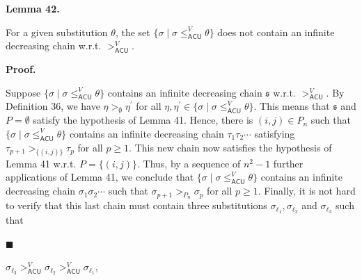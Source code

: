  
\par\medskip\noindent\textbf{Lemma 42.}\par
 
 
For a given substitution $\theta$, the set $\{\sigma\mid\sigma\leq_{\mathsf{ACU}}^{V}\theta\}$ does not contain an infinite decreasing chain w.r.t. $>_{\mathsf{ACU}}^{V}$.\par
 
 
 
 
 
\par\medskip\noindent\textbf{Proof.}\par
 
 
Suppose $\{\sigma\mid\sigma\leq_{\mathsf{ACU}}^{V}\theta\}$ contains an infinite decreasing chain $\mathfrak{s}$ w.r.t. $>_{\mathsf{ACU}}^{V}$. By Definition 36, we have $\eta>_{\emptyset}\eta^{\prime}$ for all $\eta,\eta^{\prime}\in\{\sigma\mid\sigma\leq_{\mathsf{ACU}}^{V}\theta\}$. This means that $\mathfrak{s}$ and $P=\emptyset$ satisfy the hypothesis of Lemma 41. Hence, there is $(i,j)\in P_{n}$ such that $\{\sigma\mid\sigma\leq_{\mathsf{ACU}}^{V}\theta\}$ contains an infinite decreasing chain $\tau_{1}\tau_{2}\cdots$ satisfying $\tau_{p+1}>_{\{(i,j)\}}\tau_{p}$ for all $p\geq 1$. This new chain now satisfies the hypothesis of Lemma 41 w.r.t. $P=\{(i,j)\}$. Thus, by a sequence of $n^{2}-1$ further applications of Lemma 41, we conclude that $\{\sigma\mid\sigma\leq_{\mathsf{ACU}}^{V}\theta\}$ contains an infinite decreasing chain $\sigma_{1}\sigma_{2}\cdots$ such that $\sigma_{p+1}>_{P_{n}}\sigma_{p}$ for all $p\geq 1$. Finally, it is not hard to verify that this last chain must contain three substitutions $\sigma_{\ell_{1}},\sigma_{\ell_{2}}$ and $\sigma_{\ell_{3}}$ such that\par
  
\par\noindent  $\blacksquare$ 
 
$\sigma_{\ell_{3}}>_{\mathsf{ACU}}^{V}\sigma_{\ell_{2}}>_{\mathsf{ACU}}^{V}%
\sigma_{\ell_{1}}$,\par
 
 
